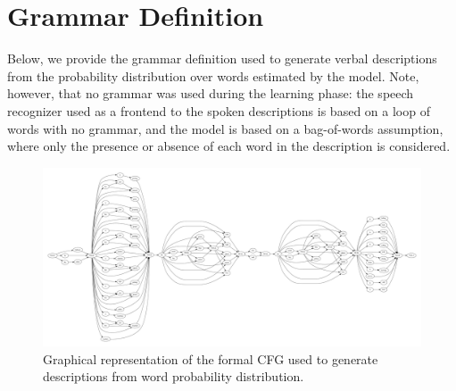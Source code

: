 \section{Grammar Definition}
\label{appendix:grammar}
Below, we provide the grammar definition used to generate verbal descriptions from the probability distribution over words estimated by the model.
Note, however, that no grammar was used during the learning phase: the speech recognizer used as a frontend to the spoken descriptions is based on a loop of words with no grammar, and the \AffWords{} model is based on a bag-of-words assumption, where only the presence or absence of each word in the description is considered.

\begin{figure}
  \includegraphics[width=\textwidth, angle=90]{figures/grammar}
  \caption{Graphical representation of the formal \acf{CFG} used to generate descriptions from word probability distribution.}
  \label{fig:grammar}
\end{figure}

